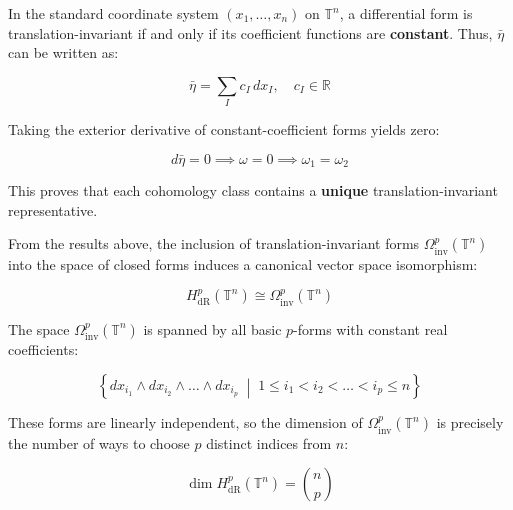\documentclass{article}
\begin{document}
	In the standard coordinate system $(x_1, \dots, x_n)$ on $\mathbb{T}^n$, a differential form is translation-invariant if and only if its coefficient functions are \textbf{constant}. Thus, $\bar{\eta}$ can be written as:
	
	\begin{equation*}
		\bar{\eta} = \sum_{I} c_I \, dx_I, \quad c_I \in \mathbb{R}
	\end{equation*}
	
	Taking the exterior derivative of constant-coefficient forms yields zero:
	
	\begin{equation*}
		d\bar{\eta} = 0 \implies \omega = 0 \implies \omega_1 = \omega_2
	\end{equation*}
	
	This proves that each cohomology class contains a \textbf{unique} translation-invariant representative.
	
	From the results above, the inclusion of translation-invariant forms $\Omega^p_{\text{inv}}(\mathbb{T}^n)$ into the space of closed forms induces a canonical vector space isomorphism:
	
	\begin{equation*}
		H^p_{\text{dR}}(\mathbb{T}^n) \cong \Omega^p_{\text{inv}}(\mathbb{T}^n)
	\end{equation*}
	
	The space $\Omega^p_{\text{inv}}(\mathbb{T}^n)$ is spanned by all basic $p$-forms with constant real coefficients:
	
	\begin{equation*}
		\left\{ dx_{i_1} \wedge dx_{i_2} \wedge \dots \wedge dx_{i_p} \;\middle|\; 1 \le i_1 < i_2 < \dots < i_p \le n \right\}
	\end{equation*}
	
	These forms are linearly independent, so the dimension of $\Omega^p_{\text{inv}}(\mathbb{T}^n)$ is precisely the number of ways to choose $p$ distinct indices from $n$:
	
	\begin{equation*}
		\dim H^p_{\text{dR}}(\mathbb{T}^n) = \binom{n}{p}
	\end{equation*}
	
\end{document}

